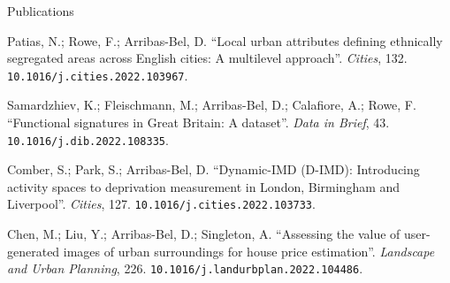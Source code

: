 \documentclass[12pt,2up]{article}
\begin{document}
\begin{cv}{}
\begin{cvlist}{Publications}
\item[] Patias, N.; Rowe, F.; Arribas-Bel, D.
        ``Local urban attributes defining ethnically segregated areas across English cities: A multilevel approach''.
        \emph{Cities}, 132. \\
        \texttt{10.1016/j.cities.2022.103967}.

\item[] Samardzhiev, K.; Fleischmann, M.; Arribas-Bel, D.; Calafiore, A.; Rowe, F.
    ``Functional signatures in Great Britain: A dataset''.
    \emph{Data in Brief}, 43.
    \texttt{10.1016/j.dib.2022.108335}.

\item[] Comber, S.; Park, S.; Arribas-Bel, D.
        ``Dynamic-IMD (D-IMD): Introducing activity spaces to deprivation
        measurement in London, Birmingham and Liverpool''.
        \emph{Cities}, 127.
        \texttt{10.1016/j.cities.2022.103733}.

\item[] Chen, M.; Liu, Y.; Arribas-Bel, D.; Singleton, A.
        ``Assessing the value of user-generated images of urban surroundings
        for house price estimation''.
        \emph{Landscape and Urban Planning}, 226.
        \texttt{10.1016/j.landurbplan.2022.104486}.


\end{cvlist}
\end{cv}
\end{document}
